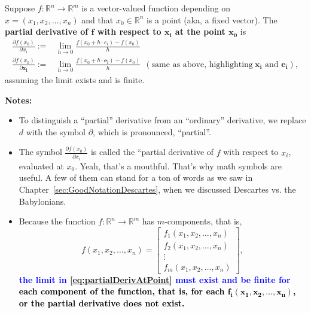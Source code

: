\begin{tcolorbox}[colback=mylightblue, title = {\bf Partial Derivative at a Point}, breakable]

\begin{definition}
\label{def:partialDerivAtPoint}
Suppose \(f:\mathbb{R}^{n} \to \mathbb{R}^{m}\) is a vector-valued function depending on \(x=(x_1, x_2, \ldots, x_n)\) and that \(x_0 \in \mathbb{R}^{n}\) is a point (aka, a fixed vector). The \textbf{partial derivative of \(\bm{f}\) with respect to \(\bm{x_i}\) at the point \(\bm{x_0}\)} is
\begin{equation}
\label{eq:partialDerivAtPoint}
\begin{aligned}
\frac{\partial f(x_0)}{\partial x_i} :=& \lim_{h \to 0} \frac{f(x_0 + h\cdot e_i) - f(x_0)}{h} \\
\frac{\partial f(x_0)}{\partial \bm{x_i}} :=&  \lim_{h \to 0} \frac{f(x_0 + h\cdot \bm{e_i}) - f(x_0)}{h}~~(\text{same as above, highlighting}~ \bm{x_i} \text{ and } \bm{e_i}),
\end{aligned}
\end{equation}
assuming the limit exists and is finite.

\textbf{Notes:}
\begin{itemize}
\item  To distinguish a ``partial'' derivative from an ``ordinary'' derivative, we replace \(d\) with the symbol \(\partial\), which is pronounced, ``partial''.
\item The symbol \(\frac{\partial f(x_0)}{\partial x_i}\) is called the ``partial derivative of \(f\) with respect to \(x_i\), evaluated at \(x_0\). Yeah, that's a mouthful. That's why math symbols are useful. A few of them can stand for a ton of words as we saw in Chapter~\ref{sec:GoodNotationDescartes}, when we discussed Descartes vs. the Babylonians.
\item Because the function \(f:\mathbb{R}^{n} \to \mathbb{R}^{m}\) has \(m\)-components, that is,
\[
f(x_1, x_2, \ldots, x_n) = \left[ \begin{array}{c} f_1(x_1, x_2, \ldots, x_n) \\ f_2(x_1, x_2, \ldots, x_n) \\ \vdots \\ f_m(x_1, x_2, \ldots, x_n) \end{array}\right],
\]
\textcolor{blue}{\bf \large the limit in \eqref{eq:partialDerivAtPoint} must exist and be finite for} \textcolor{black}{\bf \large each component of the function, that is, for each \(\bm {f_i(x_1, x_2, \ldots, x_n)}\), or the partial derivative does not exist.}
\end{itemize}

\end{definition}
\end{tcolorbox}

